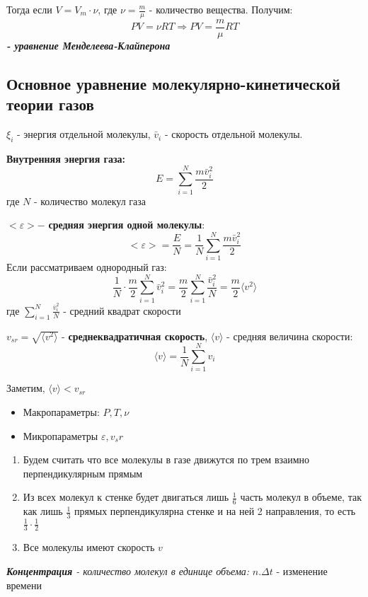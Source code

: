 \documentclass[../main.tex]{subfiles}
\begin{document}
\vspace{5px}

Тогда если $V = V_m \cdot \nu$, где $\nu = \frac{m}{\mu}$ - количество вещества. Получим:
\[ PV = \nu R T \Rightarrow PV = \frac{m}{\mu} R T \]
\textit{\textbf{- уравнение Менделеева-Клайперона}}


\subsection{Основное уравнение молекулярно-кинетической теории газов}

$\xi_i$ - энергия отдельной молекулы, $\bar v_i$ - скорость отдельной молекулы.

\vspace{6px}

\textbf{Внутренняя энергия газа:} \[ E = \sum_{i = 1}^N \frac{m \bar v_i^2}{2}\] где $N$ - количество молекул газа

\vspace{6px}

$<\varepsilon> - $ \textbf{средняя энергия одной молекулы}:
\[ <\varepsilon> = \frac{E}{N} = \frac{1}{N} \sum_{i = 1}^N \frac{m \bar v_i^2}{2} \]
Если рассматриваем однородный газ:
\[ \frac{1}{N} \cdot \frac{m}{2} \sum_{i = 1}^N {\bar v_i^2} = \frac{m}{2} \sum_{i = 1}^N \frac{\bar v_i^2}{N} = \frac{m}{2} \langle v^2 \rangle\]
где $\sum_{i = 1}^N \frac{\bar v_i^2}{N}$ - средний квадрат скорости

\vspace{6px}

$v_{sr} = \sqrt{\langle v^2 \rangle}$ - \textbf{среднеквадратичная скорость}, $\langle v \rangle$ - средняя величина скорости: \[ \langle v \rangle = \frac{1}{N}\sum_{i = 1}^N {v_i} \]

Заметим, $\langle v \rangle < v_{sr}$

\vspace{6px}
\begin{itemize}
    \item Макропараметры: $P, T ,\nu$
    \item Микропараметры $\varepsilon, v_sr$
\end{itemize}

\begin{enumerate}
    \item Будем считать что все молекулы в газе движутся по трем взаимно перпендикулярным прямым
    \item Из всех молекул к стенке будет двигаться лишь $\frac{1}{6}$ часть молекул в объеме, так как лишь $\frac{1}{3}$ прямых перпендикулярна стенке и на ней 2 направления, то есть $\frac{1}{3} \cdot \frac{1}{2}$
    \item Все молекулы имеют скорость $v$
\end{enumerate}
 \textit{\textbf{Концентрация} - количество молекул в единице объема:} $n. \Delta t$ - изменение времени
\end{document}
